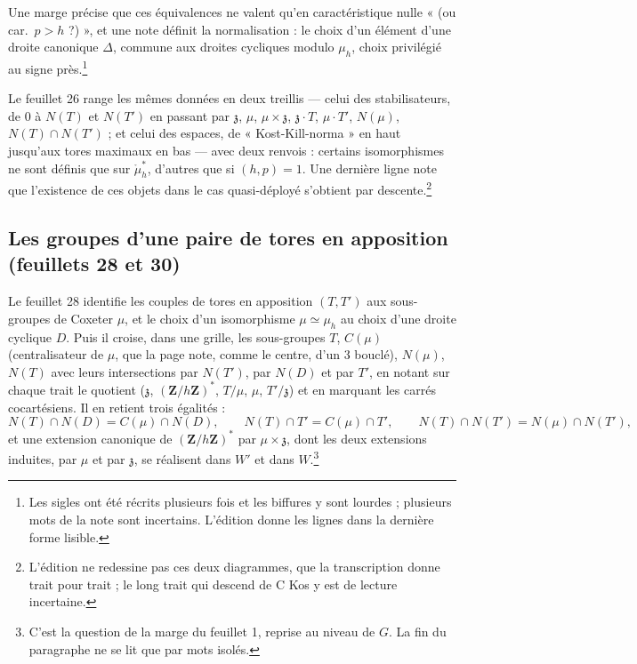\documentclass[11pt,a4paper]{article}
\begin{document}
Une marge précise que ces équivalences ne valent qu'en caractéristique nulle
« (ou car.\ $p>h$ ?) », et une note définit la normalisation : le choix d'un
élément d'une droite canonique $\Delta$, commune aux droites cycliques modulo
$\mu_{h}$, choix privilégié au signe près.\footnote{Les sigles ont été récrits
plusieurs fois et les biffures y sont lourdes ; plusieurs mots de la note sont
incertains. L'édition donne les lignes dans la dernière forme lisible.}

Le feuillet 26 range les mêmes données en deux treillis — celui des
stabilisateurs, de $0$ à $N(T)$ et $N(T')$ en passant par $\mathfrak{z}$,
$\mu$, $\mu\times\mathfrak{z}$, $\mathfrak{z}\cdot T$, $\mu\cdot T'$, $N(\mu)$,
$N(T)\cap N(T')$ ; et celui des espaces, de « Kost-Kill-norma » en haut jusqu'aux
tores maximaux en bas — avec deux renvois : certains isomorphismes ne sont
définis que sur $\mathring{\mu}_{h}^{*}$, d'autres que si $(h,p)=1$. Une
dernière ligne note que l'existence de ces objets dans le cas quasi-déployé
s'obtient par descente.\footnote{L'édition ne redessine pas ces deux
diagrammes, que la transcription donne trait pour trait ; le long trait qui
descend de C Kos y est de lecture incertaine.}

\subsection*{Les groupes d'une paire de tores en apposition (feuillets 28 et 30)}

Le feuillet 28 identifie les couples de tores en apposition $(T,T')$ aux
sous-groupes de Coxeter $\mu$, et le choix d'un isomorphisme $\mu\simeq\mu_{h}$
au choix d'une droite cyclique $D$. Puis il croise, dans une grille, les
sous-groupes $T$, $C(\mu)$ (centralisateur de $\mu$, que la page note, comme le centre, d'un 3 bouclé), $N(\mu)$, $N(T)$
avec leurs intersections par $N(T')$, par $N(D)$ et par $T'$, en notant sur chaque
trait le quotient ($\mathfrak{z}$, $(\mathbf{Z}/h\mathbf{Z})^{*}$,
$T/\mu$, $\mu$, $T'/\mathfrak{z}$) et en marquant les carrés cocartésiens. Il
en retient trois égalités :
\[
  N(T)\cap N(D)=C(\mu)\cap N(D),\qquad
  N(T)\cap T'=C(\mu)\cap T',\qquad
  N(T)\cap N(T')=N(\mu)\cap N(T'),
\]
et une extension canonique de $(\mathbf{Z}/h\mathbf{Z})^{*}$ par
$\mu\times\mathfrak{z}$, dont les deux extensions induites, par $\mu$ et par
$\mathfrak{z}$, se réalisent dans $W'$ et dans $W$.\footnote{C'est la question
de la marge du feuillet 1, reprise au niveau de $G$. La fin du paragraphe ne
se lit que par mots isolés.}
\end{document}
